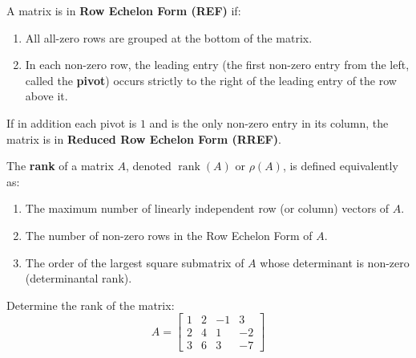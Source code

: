 \begin{definition}
A matrix is in \textbf{Row Echelon Form (REF)} if:
\begin{enumerate}[leftmargin=1.5em]
    \item All all-zero rows are grouped at the bottom of the matrix.
    \item In each non-zero row, the leading entry (the first non-zero entry from the left, called the \textbf{pivot}) occurs strictly to the right of the leading entry of the row above it.
\end{enumerate}
If in addition each pivot is $1$ and is the only non-zero entry in its column, the matrix is in \textbf{Reduced Row Echelon Form (RREF)}.
\end{definition}

\begin{definition}
The \textbf{rank} of a matrix $A$, denoted $\operatorname{rank}(A)$ or $\rho(A)$, is defined equivalently as:
\begin{enumerate}[leftmargin=1.5em]
    \item The maximum number of linearly independent row (or column) vectors of $A$.
    \item The number of non-zero rows in the Row Echelon Form of $A$.
    \item The order of the largest square submatrix of $A$ whose determinant is non-zero (determinantal rank).
\end{enumerate}
\end{definition}

\begin{example}
Determine the rank of the matrix:
\begin{equation}
A = \begin{bmatrix}
1 & 2 & -1 & 3 \\
2 & 4 & 1 & -2 \\
3 & 6 & 3 & -7
\end{bmatrix}
\end{equation}
\end{example}

